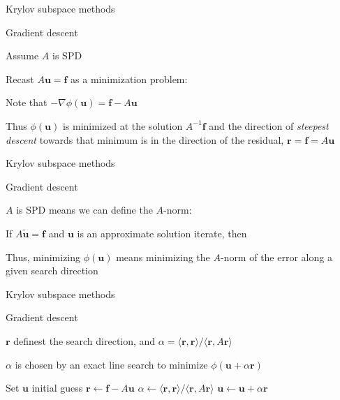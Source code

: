 \documentclass[18pt,xcolor=table]{beamer}
\begin{document}
\begin{frame}{Krylov subspace methods}
\begin{block}{Gradient descent}
\bit
\item Assume $A$ is SPD
\item Recast $A\mathbf{u} = \mathbf{f}$ as a minimization problem:
\item Note that $-\nabla \phi(\mathbf{u}) = \mathbf{f} - A\mathbf{u}$
\item Thus $\phi(\mathbf{u})$ is minimized at the solution $A^{-1}\mathbf{f}$ and the direction of \emph{steepest descent} towards that minimum is in the direction of the residual, $\mathbf{r} = \mathbf{f} = A\mathbf{u}$
\eit
\end{block}
\end{frame}

\begin{frame}{Krylov subspace methods}
\begin{block}{Gradient descent}
\bit
\item $A$ is SPD means we can define the $A$-norm:
\item If $A\mathbf{\tilde{u}} = \mathbf{f}$ and $\mathbf{u}$ is an approximate solution iterate, then 
\item Thus, minimizing $\phi(\mathbf{u})$ means minimizing the $A$-norm of the error along a given search direction
\eit
\end{block}
\end{frame}

\begin{frame}{Krylov subspace methods}
\begin{block}{Gradient descent}
\bit
\item $\mathbf{r}$ definest the search direction, and $\alpha = \langle \mathbf{r}, \mathbf{r} \rangle / \langle \mathbf{r}, A\mathbf{r} \rangle$
\item $\alpha$ is chosen by an exact line search to minimize $\phi(\mathbf{u} + \alpha \mathbf{r})$
\eit
\end{block}
\begin{algorithm}[H]
\caption{Gradient descent}
\begin{algorithmic}
\State Set $\mathbf{u}$ initial guess
\State $\mathbf{r} \leftarrow \mathbf{f} - A\mathbf{u}$
\State $\alpha \leftarrow \langle \mathbf{r}, \mathbf{r} \rangle / \langle \mathbf{r}, A\mathbf{r} \rangle$
\State $\mathbf{u} \leftarrow \mathbf{u} + \alpha\mathbf{r}$
\EndFor
\end{algorithmic}
\end{algorithm}
\end{frame}
\end{document}
